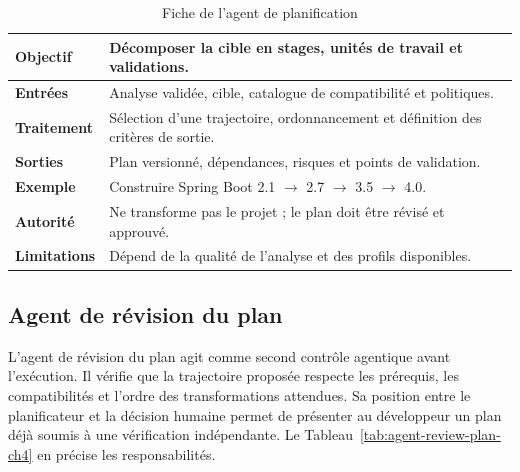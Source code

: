 \begin{table}[H]
    \centering
    \caption{Fiche de l'agent de planification}
    \label{tab:agent-planification-ch4}
    \small
    \begin{tabularx}{\textwidth}{|>{\bfseries\RaggedRight\arraybackslash}p{3.1cm}|>{\RaggedRight\arraybackslash}X|}
        \hline
        Objectif & Décomposer la cible en stages, unités de travail et validations. \\
        \hline
        Entrées & Analyse validée, cible, catalogue de compatibilité et politiques. \\
        \hline
        Traitement & Sélection d'une trajectoire, ordonnancement et définition des critères de sortie. \\
        \hline
        Sorties & Plan versionné, dépendances, risques et points de validation. \\
        \hline
        Exemple & Construire Spring Boot 2.1 $\rightarrow$ 2.7 $\rightarrow$ 3.5 $\rightarrow$ 4.0. \\
        \hline
        Autorité & Ne transforme pas le projet ; le plan doit être révisé et approuvé. \\
        \hline
        Limitations & Dépend de la qualité de l'analyse et des profils disponibles. \\
        \hline
    \end{tabularx}
\end{table}

\subsection{Agent de révision du plan}

L'agent de révision du plan agit comme second contrôle agentique avant l'exécution. Il vérifie que la trajectoire proposée respecte les prérequis, les compatibilités et l'ordre des transformations attendues. Sa position entre le planificateur et la décision humaine permet de présenter au développeur un plan déjà soumis à une vérification indépendante. Le Tableau~\ref{tab:agent-review-plan-ch4} en précise les responsabilités.

